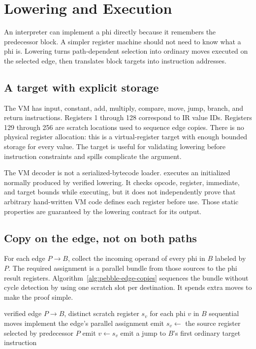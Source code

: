 \chapter{Lowering and Execution}
\label{ch:pebble-lowering}

An interpreter can implement a phi directly because it remembers the predecessor block.
A simpler register machine should not need to know what a phi is.
Lowering turns path-dependent selection into ordinary moves executed on the selected edge, then translates block targets into instruction addresses.

\section{A target with explicit storage}
\label{sec:pebble-vm}
The VM has input, constant, add, multiply, compare, move, jump, branch, and return instructions.
Registers 1 through 128 correspond to IR value IDs.
Registers 129 through 256 are scratch locations used to sequence edge copies.
There is no physical register allocation: this is a virtual-register target with enough bounded storage for every value.
The target is useful for validating lowering before instruction constraints and spills complicate the argument.

The VM decoder is not a serialized-bytecode loader.
 executes an initialized  normally produced by verified lowering.
It checks opcode, register, immediate, and target bounds while executing, but it does not independently prove that arbitrary hand-written VM code defines each register before use.
Those static properties are guaranteed by the lowering contract for its output.

\section{Copy on the edge, not on both paths}
\label{sec:pebble-edge-lowering}
For each edge $P\to B$, collect the incoming operand of every phi in $B$ labeled by $P$.
The required assignment is a parallel bundle from those sources to the phi result registers.
Algorithm~\ref{alg:pebble-edge-copies} sequences the bundle without cycle detection by using one scratch slot per destination.
It spends extra moves to make the proof simple.

\begin{algorithm}[htbp]
\caption{Lowering a phi bundle into two phases of moves.}
\label{alg:pebble-edge-copies}
\begin{pseudocode}
\Require verified edge $P\to B$, distinct scratch register $s_v$ for each phi $v$ in $B$
\Ensure sequential moves implement the edge's parallel assignment
\State emit $s_v\gets$ the source register selected by predecessor $P$
\EndFor
{}
\State emit $v\gets s_v$
\EndFor
\State emit a jump to $B$'s first ordinary target instruction
\end{pseudocode}
\end{algorithm}

